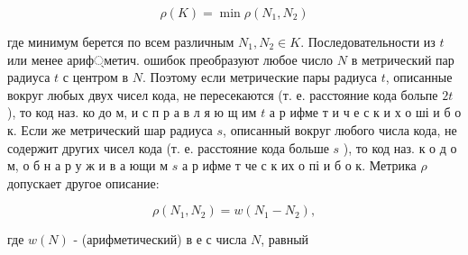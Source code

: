 \documentclass[10pt]{article}
\begin{document}
\[

\rho(K)=\min \rho\left(N_{1}, N_{2}\right)

\]



где минимум берется по всем различным $N_{1}, N_{2} \in K$. Последовательности из $t$ или менее ариф্метич. ошибок преобразуют любое число $N$ в метрический пар радиуса $t$ с центром в $N$. Поэтому если метрические пары радиуса $t$, описанные вокруг любых двух чисел кода, не пересекаются (т. е. расстояние кода больпе $2 t$ ), то код наз. ко до м, и с п р а в л я ю щ им $t$ а р ифме т и ч е с к и х о ші и б о к. Если же метрический шар радиуса $s$, описанный вокруг любого числа кода, не содержит других чисел кода (т. е. расстояние кода больше $s$ ), то код наз. к о д о м, о б н а р у ж и в а ющи м $s$ а р ифме т че с к их о пі и б о к. Метрика $\rho$ допускает другое описание:



\[

\rho\left(N_{1}, N_{2}\right)=w\left(N_{1}-N_{2}\right),

\]



где $w(N)$ - (арифметический) в е с числа $N$, равный
\end{document}
